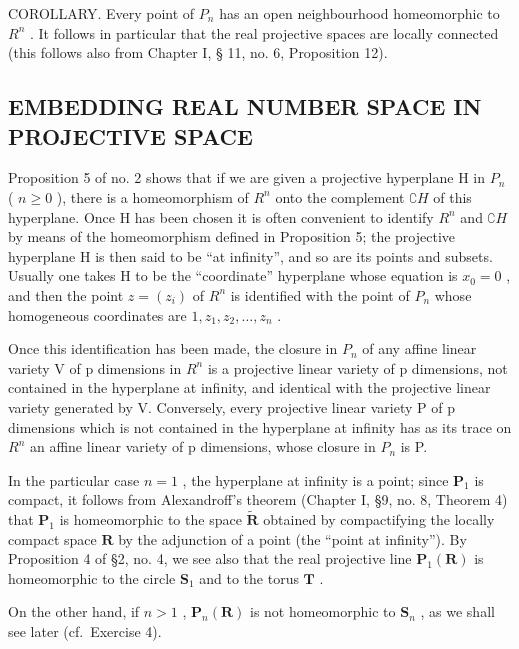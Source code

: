 COROLLARY. Every point of \(P_{n}\) has an open neighbourhood homeomorphic to \(R^{n}\) . It follows in particular that the real projective spaces are locally connected (this follows also from Chapter I, § 11, no. 6, Proposition 12).

\subsection{EMBEDDING REAL NUMBER SPACE IN PROJECTIVE SPACE}

Proposition 5 of no. 2 shows that if we are given a projective hyperplane H in \(P_{n}\) ( \(n \geqslant 0\) ), there is a homeomorphism of \(R^{n}\) onto the complement \(\complement H\) of this hyperplane. Once H has been chosen it is often convenient to identify \(R^{n}\) and \(\complement H\) by means of the homeomorphism defined in Proposition 5; the projective hyperplane H is then said to be ``at infinity'', and so are its points and subsets. Usually one takes H to be the ``coordinate'' hyperplane whose equation is \(x_{0}=0\) , and then the point \(z=(z_{i})\) of \(R^{n}\) is identified with the point of \(P_{n}\) whose homogeneous coordinates are \(1, z_{1}, z_{2}, \ldots, z_{n}\) .

Once this identification has been made, the closure in \(P_{n}\) of any affine linear variety V of p dimensions in \(R^{n}\) is a projective linear variety of p dimensions, not contained in the hyperplane at infinity, and identical with the projective linear variety generated by V. Conversely, every projective linear variety P of p dimensions which is not contained in the hyperplane at infinity has as its trace on \(R^{n}\) an affine linear variety of p dimensions, whose closure in \(P_{n}\) is P.

In the particular case \(n = 1\) , the hyperplane at infinity is a point; since \(\mathbf{P}_1\) is compact, it follows from Alexandroff's theorem (Chapter I, §9, no. 8, Theorem 4) that \(\mathbf{P}_1\) is homeomorphic to the space \(\tilde{\mathbf{R}}\) obtained by compactifying the locally compact space \(\mathbf{R}\) by the adjunction of a point (the ``point at infinity''). By Proposition 4 of §2, no. 4, we see also that the real projective line \(\mathbf{P}_1(\mathbf{R})\) is homeomorphic to the circle \(\mathbf{S}_1\) and to the torus \(\mathbf{T}\) .

On the other hand, if \(n > 1\) , \(\mathbf{P}_n(\mathbf{R})\) is not homeomorphic to \(\mathbf{S}_n\) , as we shall see later (cf.~Exercise 4).

